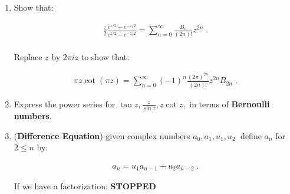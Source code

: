 \begin{enumerate}
\begin{enumerate}
    \end{enumerate}
    
    \item Show that:
  
    \begin{align*}
      \frac{z}{2} \frac{e^{z/2} + e^{-z/2}}{e^{z/2} - e^{-z/2}} = \sum_{n = 0}^\infty \frac{B_n}{(2n)!}z^{2n} \;. \\
    \end{align*}
  
    Replace $z$ by $2\pi i z$ to show that:
  
    \begin{align*}
      \pi z \cot(\pi z) = \sum_{n = 0}^\infty (-1)^n \frac{(2\pi)^{2n}}{(2n)!} z^{2n} B_{2n} \;.
    \end{align*}
  
    \item Express the power series for $\tan z , \frac{z}{\sin z}, z \cot z ,$ in terms of \textbf{Bernoulli numbers}.
  
    \item (\textbf{Difference Equation}) given complex numbers $a_0, a_1, u_1, u_2 \;$ define $a_n$ for $2 \leq n$ by:
  
    \begin{align*}
      a_n = u_1 a_{n - 1} +u_2 a_{n - 2} \;.
    \end{align*}
  
    If we have a factorization: \textbf{STOPPED}
  \end{enumerate}
  \newpage